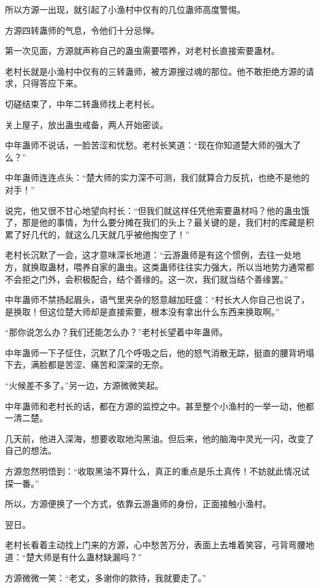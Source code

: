 \begin{this_body}
所以方源一出现，就引起了小渔村中仅有的几位蛊师高度警惕。

方源四转蛊师的气息，令他们十分忌惮。

第一次见面，方源就声称自己的蛊虫需要喂养，对老村长直接索要蛊材。

老村长就是小渔村中仅有的三转蛊师，被方源搜过魂的那位。他不敢拒绝方源的请求，只得答应下来。

切磋结束了，中年二转蛊师找上老村长。

关上屋子，放出蛊虫戒备，两人开始密谈。

中年蛊师不说话，一脸苦涩和忧愁。老村长笑道：“现在你知道楚大师的强大了么？”

中年蛊师连连点头：“楚大师的实力深不可测，我们就算合力反抗，也绝不是他的对手！”

说完，他又很不甘心地望向村长：“但我们就这样任凭他索要蛊材吗？他的蛊虫饿了，那是他的事情，为什么要分摊在我们的头上？最关键的是，我们村的库藏是积累了好几代的，就这么几天就几乎被他掏空了！”

老村长沉默了一会，这才意味深长地道：“云游蛊师是有这个惯例，去往一处地方，就换取蛊材，喂养自家的蛊虫。这类蛊师往往实力强大，所以当地势力通常都不会拒之门外，会积极配合，结个善缘的。这一次，我们就当结个善缘罢。”

中年蛊师不禁扬起眉头，语气里夹杂的怒意越加旺盛：“村长大人你自己也说了，是换取！但这位楚大师却是直接索要，根本没有拿出什么东西来换取啊。”

“那你说怎么办？我们还能怎么办？”老村长望着中年蛊师。

中年蛊师一下子怔住，沉默了几个呼吸之后，他的怒气消散无踪，挺直的腰背坍塌下去，满脸都是苦涩、痛苦和深深的无奈。

“火候差不多了。”另一边，方源微微笑起。

中年蛊师和老村长的话，都在方源的监控之中。甚至整个小渔村的一举一动，他都一清二楚。

几天前，他进入深海，想要收取地沟黑油。但后来，他的脑海中灵光一闪，改变了自己的想法。

方源忽然明悟到：“收取黑油不算什么，真正的重点是乐土真传！不妨就此情况试探一番。”

所以，方源便换了一个方式，依靠云游蛊师的身份，正面接触小渔村。

翌日。

老村长看着主动找上门来的方源，心中愁苦万分，表面上去堆着笑容，弓背弯腰地道：“楚大师是有什么蛊材缺漏吗？”

方源微微一笑：“老丈，多谢你的款待，我就要走了。”


\end{this_body}
